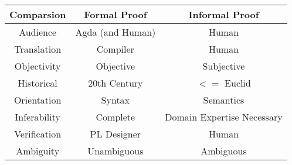 \documentclass[10pt]{beamer}
\begin{document}
\begin{frame}

\centering

  



\begin{tabular}{|c|c|c|} \hline
  Comparsion & Formal Proof & Informal Proof \\ \hline
  Audience & Agda (and Human) & Human \\ \hline
  Translation & Compiler & Human \\ \hline
  Objectivity & Objective & Subjective \\ \hline %
  Historical & 20th Century & $<=$ Euclid \\ \hline
  Orientation & Syntax & Semantics \\ \hline
  Inferability & Complete & Domain Expertise Necessary \\ \hline
  Verification & PL Designer & Human \\ \hline
  Ambiguity & Unambiguous & Ambiguous \\ \hline

\end{tabular}

\end{frame}
\end{document}
